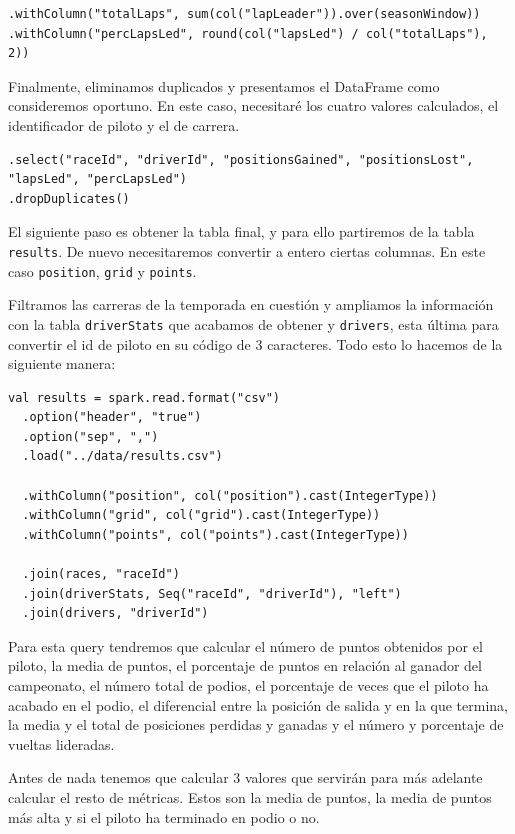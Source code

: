 \documentclass[12pt,twoside,titlepage]{report}
\begin{document}
\begin{lstlisting}
.withColumn("totalLaps", sum(col("lapLeader")).over(seasonWindow))
.withColumn("percLapsLed", round(col("lapsLed") / col("totalLaps"), 2))
\end{lstlisting}

Finalmente, eliminamos duplicados y presentamos el DataFrame como consideremos oportuno. En este caso, necesitaré los cuatro valores calculados, el identificador de piloto y el de carrera.

\begin{lstlisting}
.select("raceId", "driverId", "positionsGained", "positionsLost", "lapsLed", "percLapsLed")
.dropDuplicates()
\end{lstlisting}

El siguiente paso es obtener la tabla final, y para ello partiremos de la tabla \texttt{results}. De nuevo necesitaremos convertir a entero ciertas columnas. En este caso \texttt{position}, \texttt{grid} y \texttt{points}.

Filtramos las carreras de la temporada en cuestión y ampliamos la información con la tabla \texttt{driverStats} que acabamos de obtener y \texttt{drivers}, esta última para convertir el id de piloto en su código de 3 caracteres. Todo esto lo hacemos de la siguiente manera:

\begin{lstlisting}
val results = spark.read.format("csv")
  .option("header", "true")
  .option("sep", ",")
  .load("../data/results.csv")

  .withColumn("position", col("position").cast(IntegerType))    
  .withColumn("grid", col("grid").cast(IntegerType))    
  .withColumn("points", col("points").cast(IntegerType))

  .join(races, "raceId")
  .join(driverStats, Seq("raceId", "driverId"), "left")
  .join(drivers, "driverId")  
\end{lstlisting}

Para esta query tendremos que calcular el número de puntos obtenidos por el piloto, la media de puntos, el porcentaje de puntos en relación al ganador del campeonato, el número total de podios, el porcentaje de veces que el piloto ha acabado en el podio, el diferencial entre la posición de salida y en la que termina, la media y el total de posiciones perdidas y ganadas y el número y porcentaje de vueltas lideradas.

Antes de nada tenemos que calcular 3 valores que servirán para más adelante calcular el resto de métricas. Estos son la media de puntos, la media de puntos más alta y si el piloto ha terminado en podio o no.
\end{document}
